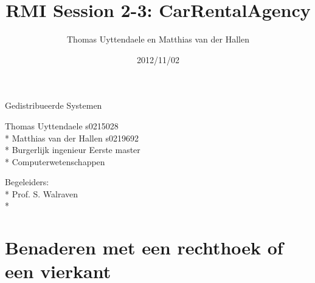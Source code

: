 \documentclass[a4paper]{article}
\title{RMI Session 2-3: CarRentalAgency}
\author{Thomas Uyttendaele en Matthias van der Hallen}
\date{2012/11/02}
\begin{document}
\begin{titlepage}

\pagestyle{plain}

\begin{center}
	{\Large Gedistribueerde Systemen}
	
	\vspace{3cm}

	{\Huge \textbf{\thetitle}}
	
	\vspace{5cm}

	{\Large	Thomas Uyttendaele s0215028 \\* Matthias van der Hallen s0219692\\* Burgerlijk ingenieur Eerste master \\* Computerwetenschappen}
\end{center}

\vspace{8cm}

\begin{center}
	{\Large Begeleiders:\\*
	Prof. S. Walraven\\*}
\end{center}

\vspace{2cm}

\begin{center}
	{\Large \thedate}
\end{center}
 
\end{titlepage}
\renewcommand{\contentsname}{Inhoudstafel}
\tableofcontents
\newpage
\section{Benaderen met een rechthoek of een vierkant}
\end{document}

